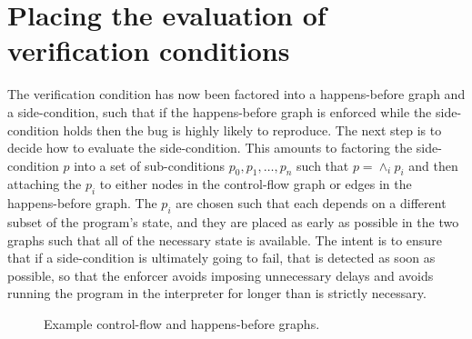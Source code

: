 \section{Placing the evaluation of verification conditions}
\label{sect:enforce:place_vcs}

The verification condition has now been factored into a happens-before
graph and a side-condition, such that if the happens-before graph is
enforced while the side-condition holds then the bug is highly likely
to reproduce.  The next step is to decide how to evaluate the
side-condition.  This amounts to factoring the side-condition $p$ into
a set of sub-conditions $p_0, p_1, {\ldots}, p_n$ such that $p =
\wedge_i p_i$ and then attaching the $p_i$ to either nodes in the
control-flow graph or edges in the happens-before
graph.  The $p_i$ are chosen such that each depends on a
different subset of the program's state, and they are placed as early
as possible in the two graphs such that all of the necessary state is
available.  The intent is to ensure that if a side-condition is
ultimately going to fail, that is detected as soon as possible, so
that the enforcer avoids imposing unnecessary delays and avoids
running the program in the interpreter for longer than is strictly
necessary.

\begin{figure}
  \caption{Example control-flow and happens-before graphs.}
  \label{fig:place_conditions_example}
\end{figure}

